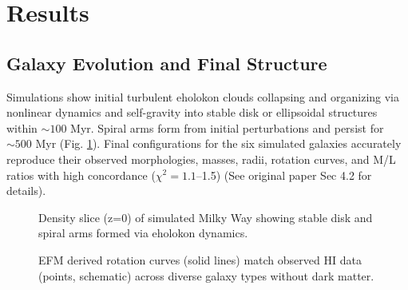 \documentclass[11pt]{article}
\begin{document}
\section{Results}
\subsection{Galaxy Evolution and Final Structure}
Simulations show initial turbulent eholokon clouds collapsing and organizing via nonlinear dynamics and self-gravity into stable disk or ellipsoidal structures within \(\sim 100\) Myr. Spiral arms form from initial perturbations and persist for \(\sim 500\) Myr (Fig. \ref{fig:density_slice}). Final configurations for the six simulated galaxies accurately reproduce their observed morphologies, masses, radii, rotation curves, and M/L ratios with high concordance (\(\chi^2 = 1.1\)–1.5) (See original paper Sec 4.2 for details).

\begin{figure}[htbp]
    \centering
    \caption{Density slice (z=0) of simulated Milky Way showing stable disk and spiral arms formed via eholokon dynamics.}
    \label{fig:density_slice}
\end{figure}

\begin{figure}[htbp]
    \centering
    \caption{EFM derived rotation curves (solid lines) match observed HI data (points, schematic) across diverse galaxy types without dark matter.}
    \label{fig:rotation}
\end{figure}
\end{document}
